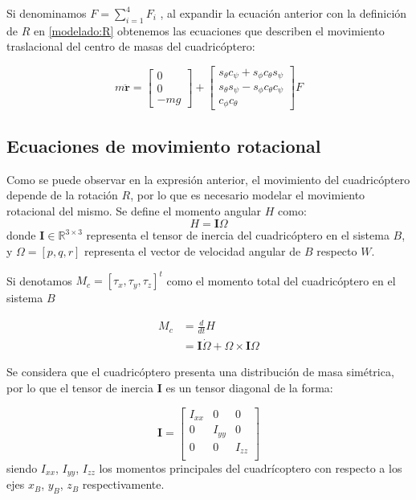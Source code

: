 Si denominamos $F  = \displaystyle\sum_{i=1}^{4}F_i$ , al expandir la ecuación anterior con la definición de $R$ en \ref{modelado:R} obtenemos las ecuaciones que describen el movimiento traslacional del centro de masas del cuadricóptero:

\begin{equation}
	\label{analisis:eq2}
	m \mathbf{\ddot{r}} = \begin{bmatrix}
		0\\
		0\\
		-mg
	\end{bmatrix} +\begin{bmatrix}
		s_{\theta}c_{\psi} + s_{\phi}c_{\theta}s_{\psi} \\
		s_{\theta}s_{\psi} - s_{\phi}c_{\theta}c_{\psi} \\
		c_{\phi}c_{\theta}
	\end{bmatrix} F
\end{equation}

\subsection{Ecuaciones de movimiento rotacional}

Como se puede observar en la expresión anterior, el movimiento del cuadricóptero depende de la rotación $R$, por lo que es necesario modelar el movimiento rotacional del mismo. Se define el momento angular $H$ como:
\begin{equation}
	H = \mathbf{I}\Omega
\end{equation}
donde $\mathbf{I} \in \mathbb{R}^{3\times 3}$ representa el tensor de inercia del cuadricóptero en el sistema $B$, y $\Omega  = [p, q, r]$ representa el vector de velocidad angular de $B$ respecto $W$. 

Si denotamos $M_c = [\tau_x, \tau_y, \tau_z]^t$ como el momento total del cuadricóptero en el sistema $B$

\begin{align}
	M_c &= \frac{d}{dt}H\nonumber\\
		&= \mathbf{I}\dot{\Omega}+\Omega\times\mathbf{I}\Omega
	\label{model:rot1}
\end{align}

Se considera que el cuadricóptero presenta una distribución de masa simétrica, por lo que el tensor de inercia $\mathbf{I}$ es un tensor diagonal de la forma:

\begin{equation}
	\mathbf{I} = \begin{bmatrix}
		I_{xx}&0&0\\
		0&I_{yy}&0\\
		0&0&I_{zz}\\
	\end{bmatrix}
\end{equation}
siendo $I_{xx}$, $I_{yy}$, $I_{zz}$ los momentos principales del cuadrícoptero con respecto a los ejes $x_B$, $y_B$, $z_B$ respectivamente.

